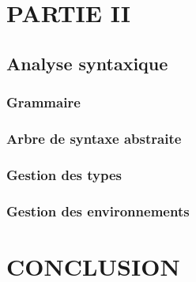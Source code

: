 \documentclass[10pt,a4paper]{report}
\begin{document}
\chapter*{PARTIE II}

\section*{Analyse syntaxique}


\subsection*{Grammaire}


\subsection*{Arbre de syntaxe abstraite}


\subsection*{Gestion des types }


\subsection*{Gestion des environnements}


\chapter*{CONCLUSION}
\end{document}
